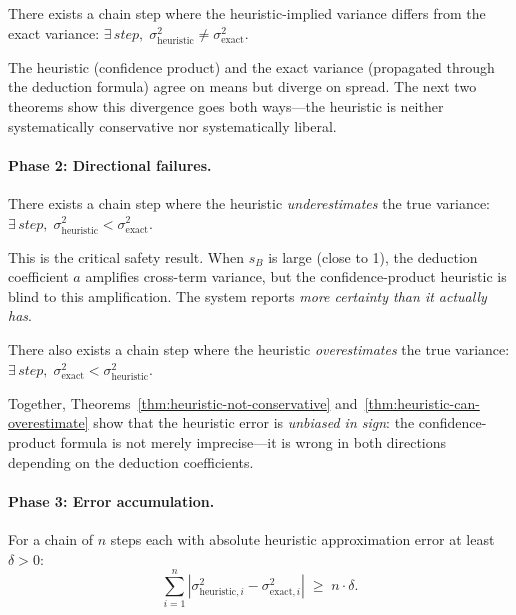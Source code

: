 \documentclass[11pt,openany]{report}
\begin{document}
\begin{theorem}
\label{thm:heuristic-variance-ne-exact}
There exists a chain step where the heuristic-implied variance differs from
the exact variance:
$\exists\, \mathit{step},\; \sigma^2_{\mathrm{heuristic}} \ne \sigma^2_{\mathrm{exact}}$.
\end{theorem}

\noindent
The heuristic (confidence product) and the exact variance (propagated
through the deduction formula) agree on means but diverge on spread.  The
next two theorems show this divergence goes both ways---the heuristic is
neither systematically conservative nor systematically liberal.

\paragraph{Phase 2: Directional failures.}
\begin{theorem}
\label{thm:heuristic-not-conservative}
There exists a chain step where the heuristic \emph{underestimates} the true
variance:
$\exists\, \mathit{step},\; \sigma^2_{\mathrm{heuristic}} < \sigma^2_{\mathrm{exact}}$.
\end{theorem}

This is the critical safety result.  When $s_B$ is large (close to 1), the
deduction coefficient $a$ amplifies cross-term variance, but the
confidence-product heuristic is blind to this amplification.  The system
reports \emph{more certainty than it actually has}.

\begin{theorem}
\label{thm:heuristic-can-overestimate}
There also exists a chain step where the heuristic \emph{overestimates} the
true variance:
$\exists\, \mathit{step},\; \sigma^2_{\mathrm{exact}} < \sigma^2_{\mathrm{heuristic}}$.
\end{theorem}

Together, Theorems~\ref{thm:heuristic-not-conservative}
and~\ref{thm:heuristic-can-overestimate} show that the heuristic error is
\emph{unbiased in sign}: the confidence-product formula is not merely
imprecise---it is wrong in both directions depending on the deduction
coefficients.

\paragraph{Phase 3: Error accumulation.}
\begin{theorem}
\label{thm:scalar-error-accumulates}
For a chain of $n$ steps each with absolute heuristic approximation error
at least $\delta > 0$:
\[
  \sum_{i=1}^{n} |\sigma^2_{\mathrm{heuristic},i} - \sigma^2_{\mathrm{exact},i}|
  \;\ge\; n \cdot \delta.
\]
\end{theorem}
\end{document}
